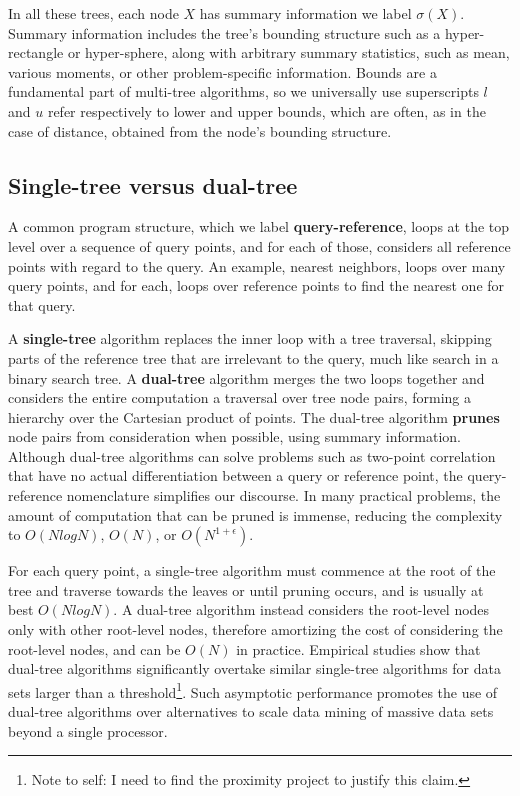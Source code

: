 \documentclass[twoside,leqno,twocolumn]{article}
\newcommand{\authornote}[1]{\footnote{Note to self: #1}}
\newcommand{\authorsnote}[1]{\authornote{#1}}
\newcommand{\mysub}[1]{\subsection{#1} }
\newcommand{\defterm}[1]{{\bf #1}}
\newcommand{\outstat}{\sigma}
\begin{document}
In all these trees, each node $X$ has summary information we label $\outstat(X)$.
Summary information includes the tree's bounding structure such as a hyper-rectangle or hyper-sphere, along with arbitrary summary statistics, such as mean, various moments, or other problem-specific information.
Bounds are a fundamental part of multi-tree algorithms, so we universally use superscripts $l$ and $u$ refer respectively to lower and upper bounds, which are often, as in the case of distance, obtained from the node's bounding structure.

\mysub{Single-tree versus dual-tree}
A common program structure, which we label \defterm{query-reference}, loops at the top level over a sequence of query points, and for each of those, considers all reference points with regard to the query.
An example, nearest neighbors, loops over many query points, and for each, loops over reference points to find the nearest one for that query.

A \defterm{single-tree} algorithm replaces the inner loop with a tree traversal, skipping parts of the reference tree that are irrelevant to the query, much like search in a binary search tree.
A \defterm{dual-tree} algorithm merges the two loops together and considers the entire computation a traversal over tree node pairs, forming a hierarchy over the Cartesian product of points.
The dual-tree algorithm \defterm{prunes} node pairs from consideration when possible, using summary information.
Although dual-tree algorithms can solve problems such as two-point correlation that have no actual differentiation between a query or reference point, the query-reference nomenclature simplifies our discourse.
In many practical problems, the amount of computation that can be pruned is immense, reducing the complexity to $O(N log N)$, $O(N)$, or $O(N^{1+\epsilon})$.

For each query point, a single-tree algorithm must commence at the root of the tree and traverse towards the leaves or until pruning occurs, and is usually at best $O(N log N)$.
A dual-tree algorithm instead considers the root-level nodes only with other root-level nodes, therefore amortizing the cost of considering the root-level nodes, and can be $O(N)$ in practice.
Empirical studies show that dual-tree algorithms significantly overtake similar single-tree algorithms for data sets larger than a threshold\authorsnote{I need to find the proximity project to justify this claim.}.
Such asymptotic performance promotes the use of dual-tree algorithms over alternatives to scale data mining of massive data sets beyond a single processor.
\end{document}
